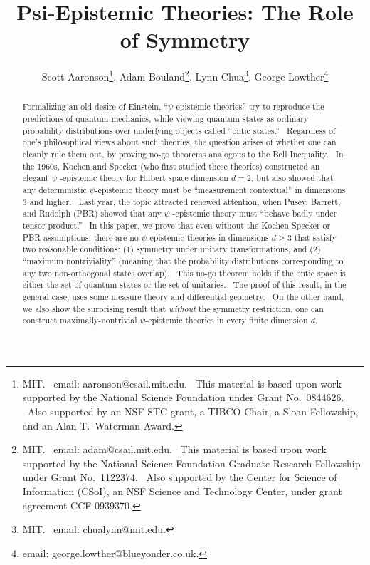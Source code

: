 \documentclass[letterpaper,12pt]{article}
\begin{document}
\title{\Large Psi-Epistemic Theories: The Role of Symmetry}
\author{\large Scott Aaronson\thanks{%
MIT. \ email: aaronson@csail.mit.edu. \ This material is based upon work
supported by the National Science Foundation under Grant No.\ 0844626. \ Also
supported by an NSF STC grant, a TIBCO Chair, a Sloan
Fellowship, and an Alan T.\ Waterman Award.},  Adam Bouland\thanks{%
MIT. \ email: adam@csail.mit.edu. \ This material is based upon work supported
by the National Science Foundation Graduate Research Fellowship under Grant
No.\ 1122374. \ Also supported by the Center for Science of Information
(CSoI), an NSF Science and Technology Center, under grant agreement
CCF-0939370.},  Lynn Chua\thanks{%
MIT. \ email: chualynn@mit.edu.},  George Lowther\thanks{%
email: george.lowther@blueyonder.co.uk.}}
\date{}
\maketitle

\begin{abstract}
Formalizing an old desire of Einstein, ``$\psi$-epistemic theories'' try to
reproduce the predictions of quantum mechanics, while viewing quantum states
as ordinary probability distributions over underlying objects called ``ontic
states.'' \ Regardless of one's philosophical views about such theories, the
question arises of whether one can cleanly rule them out, by proving no-go
theorems analogous to the Bell Inequality. \ In the 1960s, Kochen and
Specker (who first studied these theories) constructed an elegant $\psi$%
-epistemic theory for Hilbert space dimension $d=2$, but also showed that
any deterministic $\psi$-epistemic theory must be ``measurement contextual''
in dimensions $3$ and higher. \ Last year, the topic attracted renewed
attention, when Pusey, Barrett, and Rudolph (PBR) showed that any $\psi$%
-epistemic theory must ``behave badly under tensor product.'' \ In this
paper, we prove that even without the Kochen-Specker or PBR assumptions,
there are no $\psi$-epistemic theories in dimensions $d\geq 3$ that satisfy
two reasonable conditions: (1) symmetry under unitary transformations, and
(2) ``maximum nontriviality'' (meaning that the probability distributions
corresponding to any two non-orthogonal states overlap). \ This no-go theorem
holds if the ontic space is either the set of quantum states or the set of unitaries. \ The proof of this result, in
the general case, uses some measure theory and differential geometry. \ On the other
hand, we also show the surprising result that \emph{without} the symmetry
restriction, one can construct maximally-nontrivial $\psi$-epistemic
theories in every finite dimension $d$.
\end{abstract}
\end{document}
